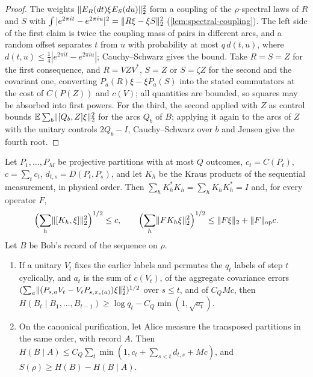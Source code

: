 \begin{proof}
The weights $\lVert E_R(dt)\xi E_S(du)\rVert_2^2$ form a coupling of the $\rho$-spectral laws of $R$ and $S$ with
$\int|e^{2\pi it}-e^{2\pi iu}|^2=\lVert R\xi-\xi S\rVert_2^2$ (\cref{lem:spectral-coupling}). The left side of the first claim is twice the
coupling mass of pairs in different arcs, and a random offset separates $t$ from $u$ with probability at most $q\,d(t,u)$,
where $d(t,u)\le\frac14|e^{2\pi it}-e^{2\pi iu}|$; Cauchy--Schwarz gives the bound. Take $R=S=Z$ for the first consequence, and
$R=VZV^*$, $S=Z$ or $S=\zeta Z$ for the second and the covariant one, converting $P_a(R)\xi-\xi P_a(S)$ into the stated
commutators at the cost of $C(P(Z))$ and $c(V)$; all quantities are bounded, so squares may be absorbed into first powers. For
the third, the second applied with $Z$ as control bounds $\mathbb E\sum_b\lVert [Q_b,Z]\xi\rVert_2^2$ for the arcs $Q_b$ of $B$; applying it again
to the arcs of $Z$ with the unitary controls $2Q_b-I$, Cauchy--Schwarz over $b$ and Jensen give the fourth root.
\end{proof}

\begin{lemma}\label{lem:histories}
Let $P_1,\dots,P_M$ be projective partitions with at most $Q$ outcomes, $c_t=C(P_t)$, $c=\sum_tc_t$, $d_{t,s}=D(P_t,P_s)$, and
let $K_h$ be the Kraus products of the sequential measurement, in physical order. Then
$\sum_hK_h^*K_h=\sum_hK_hK_h^*=I$ and, for every operator $F$,
\[
\Bigl(\sum_h\lVert [K_h,\xi]\rVert_2^2\Bigr)^{1/2}\le c,\qquad\Bigl(\sum_h\lVert FK_h\xi\rVert_2^2\Bigr)^{1/2}\le\lVert F\xi\rVert_2+\lVert F\rVert_{\mathrm{op}}c .
\]
Let $B$ be Bob's record of the sequence on $\rho$.
\begin{enumerate}[label=(\alph*),itemsep=1pt]
\item If a unitary $V_t$ fixes the earlier labels and permutes the $q_t$ labels of step $t$ cyclically, and $a_t$ is the sum of
$c(V_t)$, of the aggregate covariance errors $(\sum_a\lVert (P_{s,a}V_t-V_tP_{s,\pi_s(a)})\xi\rVert_2^2)^{1/2}$ over $s\le t$, and of $C_QMc$,
then $H(B_t\mid B_1,\dots,B_{t-1})\ge\log q_t-C_Q\min(1,\sqrt{a_t})$.
\item On the canonical purification, let Alice measure the transposed partitions in the same order, with record $A$. Then
$H(B\mid A)\le C_Q\sum_t\min(1,c_t+\sum_{s<t}d_{t,s}+Mc)$, and $S(\rho)\ge H(B)-H(B\mid A)$.
\end{enumerate}
\end{lemma}

